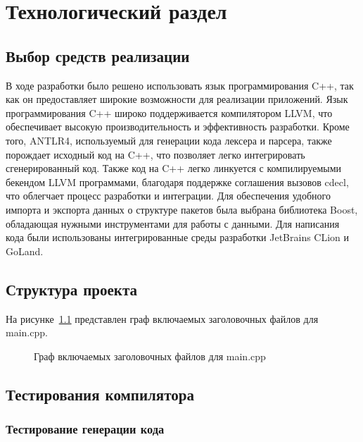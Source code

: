 \chapter{Технологический раздел}
\label{cha:impl}

\section{Выбор средств реализации}

В ходе разработки было решено использовать язык программирования C++, так как он предоставляет широкие возможности для реализации приложений.
Язык программирования C++ широко поддерживается компилятором LLVM, что обеспечивает высокую производительность и эффективность разработки.
Кроме того, ANTLR4, используемый для генерации кода лексера и парсера, также порождает исходный код на C++, что позволяет легко интегрировать сгенерированный код.
Также код на C++ легко линкуется с компилируемыми бекендом LLVM программами, благодаря поддержке соглашения вызовов cdecl, что облегчает процесс разработки и интеграции.
Для обеспечения удобного импорта и экспорта данных о структуре пакетов была выбрана библиотека Boost, обладающая нужными инструментами для работы с данными.
Для написания кода были использованы интегрированные среды разработки JetBrains CLion и GoLand.

\section{Структура проекта}



На рисунке~\ref{fig:code-usage} представлен граф включаемых заголовочных файлов для main.cpp.

\begin{figure}[h]
    \centering

    

    \caption{Граф включаемых заголовочных файлов для main.cpp}
    \label{fig:code-usage}
\end{figure}


\section{Тестирования компилятора}

\subsection*{Тестирование генерации кода}

